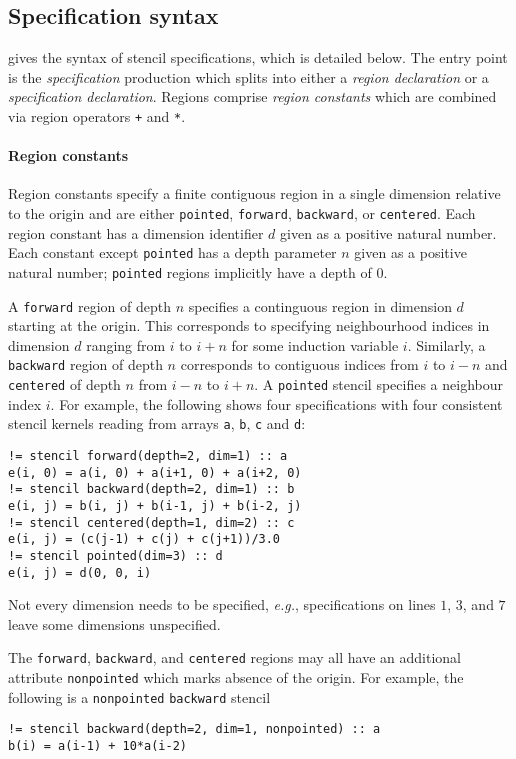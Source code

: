 \documentclass[10pt,preprint]{sigplanconf}
\theoremstyle{definition}
\newcommand{\eg}{\emph{e.g.}}
\newcommand{\nonterm}[1]{\textit{#1}}
\newcommand{\term}[1]{\texttt{#1}}
\begin{document}
\subsection{Specification syntax}
\label{subsec:syntax}

 gives the syntax of stencil specifications, which is
detailed below. The entry point is the \nonterm{specification} production which
splits into either a \emph{region declaration} or a \emph{specification
declaration}.
Regions comprise \emph{region constants} which are
combined via region operators \term{+} and \term{*}.

\paragraph{Region constants}

Region constants specify a finite contiguous region in a
single dimension relative to the origin and are either \term{pointed},
\term{forward}, \term{backward}, or \term{centered}.  Each region
constant has a dimension identifier $d$ given as a positive natural number.
Each constant except \term{pointed} has a depth
parameter $n$ given as a positive natural number; \term{pointed}
regions implicitly have a depth of $0$.

A \term{forward} region of depth $n$ specifies a continguous
region in dimension $d$ starting at the origin. This corresponds
to specifying neighbourhood indices in dimension $d$ ranging from $i$ to $i + n$
for some induction variable $i$. Similarly, a
\term{backward} region of depth $n$ corresponds to contiguous indices
from $i$ to $i - n$ and \term{centered}
of depth $n$ from $i - n$ to $i + n$. A \term{pointed}
stencil specifies a neighbour index $i$. For example, the
following shows four specifications with four consistent stencil
kernels reading from arrays \term{a}, \term{b}, \term{c} and \term{d}:
\begin{verbatim}
!= stencil forward(depth=2, dim=1) :: a
e(i, 0) = a(i, 0) + a(i+1, 0) + a(i+2, 0)
!= stencil backward(depth=2, dim=1) :: b
e(i, j) = b(i, j) + b(i-1, j) + b(i-2, j)
!= stencil centered(depth=1, dim=2) :: c
e(i, j) = (c(j-1) + c(j) + c(j+1))/3.0
!= stencil pointed(dim=3) :: d
e(i, j) = d(0, 0, i)
\end{verbatim}
Not every dimension needs to be specified, \eg{},
specifications on lines $1$, $3$, and $7$ leave some dimensions unspecified.

The \term{forward}, \term{backward}, and \term{centered} regions may
all have an additional attribute \term{nonpointed} which marks absence
of the origin.  For example, the following is a
\term{nonpointed} \term{backward} stencil
%
\begin{verbatim}
!= stencil backward(depth=2, dim=1, nonpointed) :: a
b(i) = a(i-1) + 10*a(i-2)
\end{verbatim}
\end{document}
